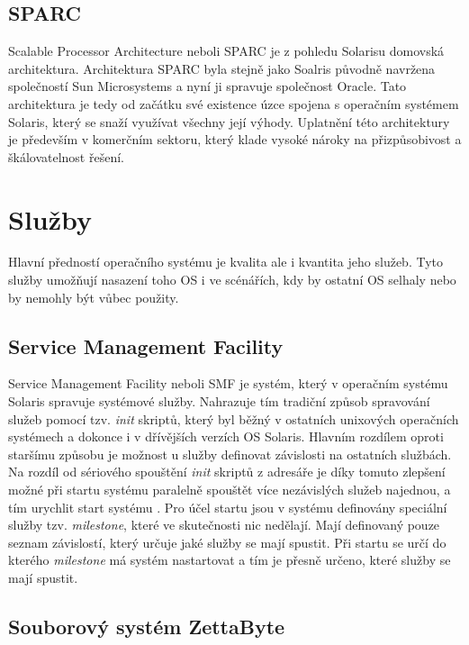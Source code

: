 \subsection{SPARC}

Scalable Processor Architecture neboli SPARC je z pohledu Solarisu domovská architektura. Architektura SPARC byla stejně jako Soalris původně navržena společností Sun Microsystems a nyní ji spravuje společnost Oracle. Tato architektura
je tedy od začátku své existence úzce spojena s operačním systémem Solaris, který se snaží využívat všechny její výhody. Uplatnění této architektury je především v komerčním sektoru, který klade vysoké nároky na přizpůsobivost a škálovatelnost řešení.

\section{Služby}

Hlavní předností operačního systému je kvalita ale i kvantita jeho služeb. Tyto služby umožňují nasazení toho OS i ve scénářích, kdy by ostatní OS selhaly nebo by nemohly být vůbec použity.  

\subsection{Service Management Facility}

Service Management Facility neboli SMF je systém, který v operačním systému Solaris spravuje systémové služby. Nahrazuje tím tradiční způsob spravování služeb pomocí tzv. \textit{init} skriptů, který byl běžný v ostatních unixových operačních systémech
a dokonce i v dřívějších verzích OS Solaris. Hlavním rozdílem oproti staršímu způsobu je možnost u služby definovat závislosti na ostatních službách. Na rozdíl od sériového spouštění \textit{init} skriptů z adresáře je díky tomuto zlepšení možné při startu systému
paralelně spouštět více nezávislých služeb najednou, a tím urychlit start systému \cite{cvut:biadu:sysstart}. Pro účel startu jsou v systému definovány speciální služby tzv. \textit{milestone}, které ve skutečnosti nic nedělají. Mají definovaný pouze seznam závislostí,
který určuje jaké služby se mají spustit. Při startu se určí do kterého \textit{milestone} má systém nastartovat a tím je přesně určeno, které služby se mají spustit.

\subsection{Souborový systém ZettaByte}


